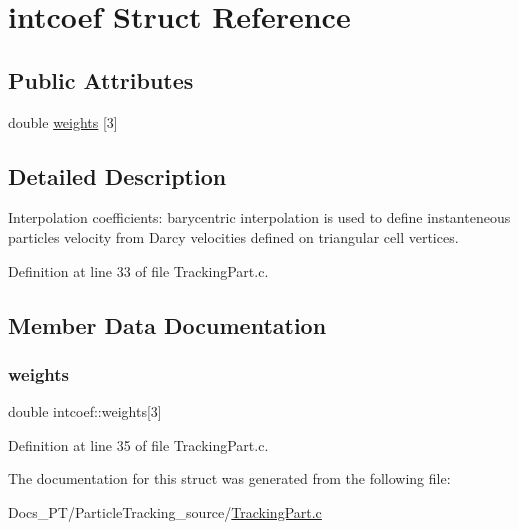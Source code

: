 \hypertarget{structintcoef}{}\section{intcoef Struct Reference}
\label{structintcoef}
\subsection*{Public Attributes}
\begin{DoxyCompactItemize}
\item 
double \mbox{\hyperlink{structintcoef_ab3d267bf2bc81e221bed2ebc1779dbf0}{weights}} \mbox{[}3\mbox{]}
\end{DoxyCompactItemize}


\subsection{Detailed Description}
Interpolation coefficients\+: barycentric interpolation is used to define instanteneous particle\textquotesingle{}s velocity from Darcy velocities defined on triangular cell vertices. 

Definition at line 33 of file Tracking\+Part.\+c.



\subsection{Member Data Documentation}
\mbox{\label{structintcoef_ab3d267bf2bc81e221bed2ebc1779dbf0}} 
\subsubsection{\texorpdfstring{weights}{weights}}
{\footnotesize\ttfamily double intcoef\+::weights\mbox{[}3\mbox{]}}



Definition at line 35 of file Tracking\+Part.\+c.



The documentation for this struct was generated from the following file\+:\begin{DoxyCompactItemize}
\item 
Docs\+\_\+\+P\+T/\+Particle\+Tracking\+\_\+source/\mbox{\hyperlink{_tracking_part_8c}{Tracking\+Part.\+c}}\end{DoxyCompactItemize}

